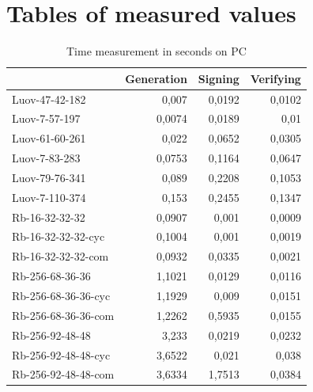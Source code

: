 \documentclass[thesis=M,english]{FITthesis}[2019/12/23]
\begin{document}
\chapter{Tables of measured values}
\begin{table}[]
\centering
\begin{tabular}{|l|r|r|r|}
\hline
                    & \multicolumn{1}{l|}{{ Generation}} & \multicolumn{1}{l|}{{ Signing}} & \multicolumn{1}{l|}{{ Verifying}} \\ \hline
 Luov-47-42-182      &  0,007                           &  0,0192                       &  0,0102                         \\ \hline
 Luov-7-57-197       &  0,0074                          &  0,0189                       &  0,01                           \\ \hline
 Luov-61-60-261      &  0,022                           &  0,0652                       &  0,0305                         \\ \hline
 Luov-7-83-283       &  0,0753                          &  0,1164                       &  0,0647                         \\ \hline
 Luov-79-76-341      &  0,089                           &  0,2208                       &  0,1053                         \\ \hline
 Luov-7-110-374      &  0,153                           &  0,2455                       &  0,1347                         \\ \hline
 Rb-16-32-32-32      &  0,0907                          &  0,001                        &  0,0009                         \\ \hline
 Rb-16-32-32-32-cyc  &  0,1004                          &  0,001                        &  0,0019                         \\ \hline
 Rb-16-32-32-32-com  &  0,0932                          &  0,0335                       &  0,0021                         \\ \hline
 Rb-256-68-36-36     &  1,1021                          &  0,0129                       &  0,0116                         \\ \hline
 Rb-256-68-36-36-cyc &  1,1929                          &  0,009                        &  0,0151                         \\ \hline
 Rb-256-68-36-36-com &  1,2262                          &  0,5935                       &  0,0155                         \\ \hline
 Rb-256-92-48-48     &  3,233                           &  0,0219                       &  0,0232                         \\ \hline
 Rb-256-92-48-48-cyc &  3,6522                          &  0,021                        &  0,038                          \\ \hline
 Rb-256-92-48-48-com &  3,6334                          &  1,7513                       &  0,0384                         \\ \hline
\end{tabular}
\caption{Time measurement in seconds on PC}
\end{table}
\end{document}
